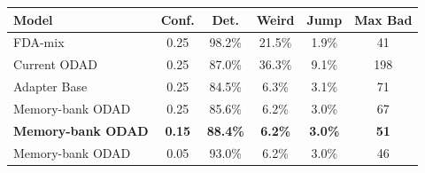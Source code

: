 \begin{tabular}{lccccc}
\toprule
Model & Conf. & Det. & Weird & Jump & Max Bad \\
\midrule
FDA-mix & 0.25 & 98.2\% & 21.5\% & 1.9\% & 41 \\
Current ODAD & 0.25 & 87.0\% & 36.3\% & 9.1\% & 198 \\
Adapter Base & 0.25 & 84.5\% & 6.3\% & 3.1\% & 71 \\
Memory-bank ODAD & 0.25 & 85.6\% & 6.2\% & 3.0\% & 67 \\
\textbf{Memory-bank ODAD} & \textbf{0.15} & \textbf{88.4\%} & \textbf{6.2\%} & \textbf{3.0\%} & \textbf{51} \\
Memory-bank ODAD & 0.05 & 93.0\% & 6.2\% & 3.0\% & 46 \\
\bottomrule
\end{tabular}
